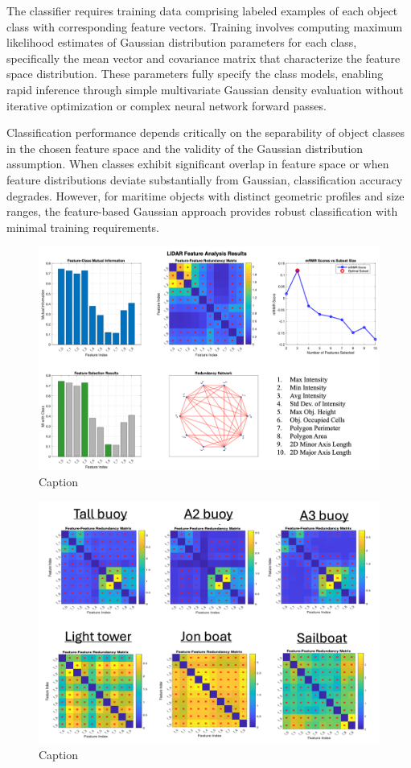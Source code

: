 \documentclass{erauthesis}
\begin{document}
The classifier requires training data comprising labeled examples of each object class with corresponding feature vectors.
Training involves computing maximum likelihood estimates of Gaussian distribution parameters for each class, specifically the mean vector and covariance matrix that characterize the feature space distribution.
These parameters fully specify the class models, enabling rapid inference through simple multivariate Gaussian density evaluation without iterative optimization or complex neural network forward passes.

Classification performance depends critically on the separability of object classes in the chosen feature space and the validity of the Gaussian distribution assumption.
When classes exhibit significant overlap in feature space or when feature distributions deviate substantially from Gaussian, classification accuracy degrades.
However, for maritime objects with distinct geometric profiles and size ranges, the feature-based Gaussian approach provides robust classification with minimal training requirements.

\begin{figure}
    \centering
    \includegraphics[width=0.95\linewidth]{Images/MI_analysis.png}
    \caption{Caption}
    \label{fig:MI_analysis}
\end{figure}

\begin{figure}
    \centering
    \includegraphics[width=0.95\linewidth]{Images/MI_pairwise.png}
    \caption{Caption}
    \label{fig:MI_pairwise}
\end{figure}
\end{document}
